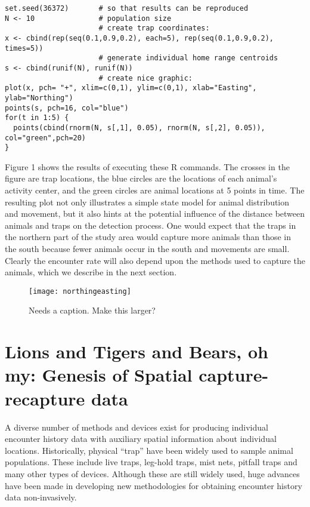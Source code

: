 {\small
\begin{verbatim}
set.seed(36372)       # so that results can be reproduced
N <- 10               # population size
                      # create trap coordinates:
x <- cbind(rep(seq(0.1,0.9,0.2), each=5), rep(seq(0.1,0.9,0.2), times=5)) 
                      # generate individual home range centroids
s <- cbind(runif(N), runif(N))    
                      # create nice graphic:
plot(x, pch= "+", xlim=c(0,1), ylim=c(0,1), xlab="Easting", ylab="Northing")
points(s, pch=16, col="blue") 
for(t in 1:5) {
  points(cbind(rnorm(N, s[,1], 0.05), rnorm(N, s[,2], 0.05)), col="green",pch=20)
}
\end{verbatim}
}

Figure 1 shows the results of executing these R commands. The crosses
in the figure are trap locations, the blue circles are the locations
of each animal's activity center, and the green circles are animal
locations at 5 points in time.  The resulting plot not only
illustrates a simple state model for animal distribution and movement,
but it also hints at the potential influence of the distance between
animals and traps on the detection process. One would expect that the
traps in the northern part of the study area would capture more
animals than those in the south because fewer animals occur in the
south and movements are small. Clearly the encounter rate will also
depend upon the methods used to capture the animals, which we describe
in the next section.

\begin{figure}
\begin{center}
\texttt{[image: northingeasting]}
\end{center}
\caption{Needs a caption. Make this larger?}
\label{fig.Rcommands}
\end{figure}

\section{Lions and Tigers and Bears, oh my:  Genesis of
Spatial capture-recapture data}

A diverse number of methods and devices exist for producing individual
encounter history data with auxiliary spatial information about
individual locations. Historically, physical ``trap'' have been widely
used to sample animal populations. These include live traps, leg-hold
traps, mist nets, pitfall traps and many other types of
devices. Although these are still widely used, huge advances have been
made in developing new methodologies for obtaining encounter history
data non-invasively.

